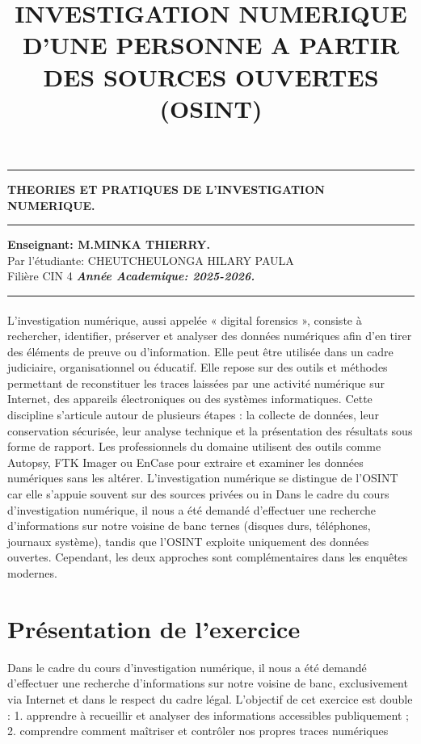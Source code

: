 \documentclass[french]{article}
\title{\textbf{INVESTIGATION NUMERIQUE D’UNE PERSONNE A PARTIR DES SOURCES OUVERTES (OSINT)}}
\date{}
\begin{document}
\thispagestyle{empty}
\begin{center}
	\rule{1\textwidth}{2pt}\vspace{\baselineskip}
	\vspace{\baselineskip}\huge\textbf{THEORIES ET PRATIQUES DE L'INVESTIGATION  NUMERIQUE.}
	\rule{1\textwidth}{2pt}\vspace{\baselineskip}
	\vspace{\baselineskip}
	\vfill
	\textbf{Enseignant: M.MINKA THIERRY.}\\
	\vfill
	Par l'étudiante: CHEUTCHEULONGA HILARY PAULA\\
	Filière CIN 4\vfill
	\vspace{\baselineskip}
	\emph{\textbf{Année Academique: 2025-2026.}}
	\rule{1\textwidth}{2pt}\vspace{\baselineskip}
\end{center}
\maketitle
\paragraph{}
L’investigation numérique, aussi appelée « digital forensics », consiste à rechercher, identifier, préserver et analyser des données numériques afin d’en tirer des éléments de preuve ou d’information. Elle peut être utilisée dans un cadre judiciaire, organisationnel ou éducatif. Elle repose sur des outils et méthodes permettant de reconstituer les traces laissées par une activité numérique sur Internet, des appareils électroniques ou des systèmes informatiques.
Cette discipline s’articule autour de plusieurs étapes : la collecte de données, leur conservation sécurisée, leur analyse technique et la présentation des résultats sous forme de rapport. Les professionnels du domaine utilisent des outils comme Autopsy, FTK Imager ou EnCase pour extraire et examiner les données numériques sans les altérer.
L’investigation numérique se distingue de l’OSINT car elle s’appuie souvent sur des sources privées ou in Dans le cadre du cours d’investigation numérique, il nous a été demandé d’effectuer une recherche d’informations sur notre voisine de banc ternes (disques durs, téléphones, journaux système), tandis que l’OSINT exploite uniquement des données ouvertes. Cependant, les deux approches sont complémentaires dans les enquêtes modernes.

\section{Présentation de l'exercice}
Dans le cadre du cours d’investigation numérique, il nous a été demandé d’effectuer une recherche d’informations sur notre voisine de banc, exclusivement via Internet et dans le respect du cadre légal.
L’objectif de cet exercice est double :
1.	apprendre à recueillir et analyser des informations accessibles publiquement ;
2.	comprendre comment maîtriser et contrôler nos propres traces numériques
\end{document}
